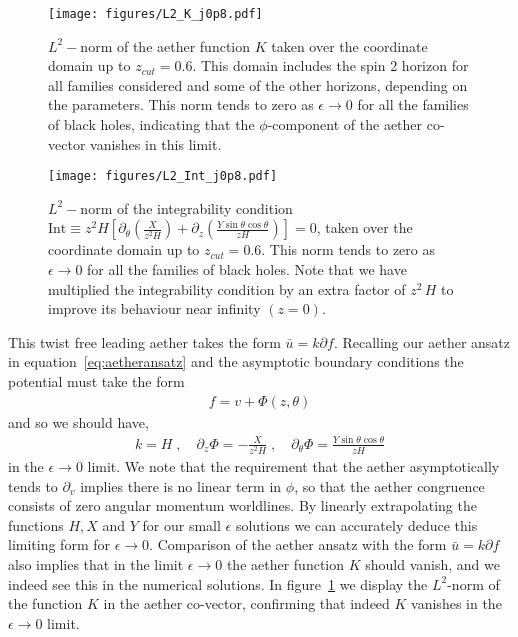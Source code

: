 \documentclass[12pt]{article}
\numberwithin{equation}{section}
\begin{document}
\begin{figure}
\centerline{  
  \texttt{[image: figures/L2\_K\_j0p8.pdf]}
  }
  \caption{\label{fig:KLimit}
  $L^2-$norm of the aether function $K$ taken over the coordinate domain up to $z_{cut}=0.6$. This domain includes the spin 2 horizon for all families considered and some of the other horizons, depending on the parameters. This norm tends to zero as $\epsilon\to 0$ for all the families of black holes, indicating that the $\phi$-component of the aether co-vector vanishes in this limit. 
  }
\end{figure}

\begin{figure}
\centerline{  
  \texttt{[image: figures/L2\_Int\_j0p8.pdf]}
  }
  \caption{\label{fig:IntLimit}
  $L^2-$norm of the integrability condition $\textrm{Int}\equiv z^2H\left[\partial_\theta \left( \frac{X}{z^2 H} \right) + \partial_z\left( \frac{Y \sin\theta \cos\theta}{z H} \right)\right] = 0$,  taken over the coordinate domain up to $z_{cut}=0.6$. This norm tends to zero as $\epsilon\to 0$ for all the families of black holes. Note that we have multiplied the integrability condition by an extra factor of $z^2\,H$ to improve its behaviour near infinity $(z=0)$.
  }
\end{figure}

This twist free leading aether takes the form $\bar{u} = k \partial f$. Recalling our aether ansatz in equation~\eqref{eq:aetheransatz} 
and the asymptotic boundary conditions
the potential must take the form
\begin{eqnarray}
f = v + \Phi(z,\theta)
\end{eqnarray}
and so we should have,
\begin{eqnarray}
k = H \; , \quad \partial_z \Phi = - \frac{X}{z^2 H} \; , \quad \partial_\theta \Phi = \frac{Y \sin\theta \cos\theta}{z H}
\end{eqnarray}
in the $\epsilon \to 0$ limit. 
We note that the requirement that the aether asymptotically tends to $\partial_v$ implies there is no linear term in $\phi$, so that the aether congruence consists of zero angular momentum worldlines. 
By linearly extrapolating the functions $H, X$ and $Y$ for our small $\epsilon$ solutions we can accurately deduce this limiting form for $\epsilon \to 0$.
Comparison of the aether ansatz with the form $\bar{u} = k \partial f$ also implies that in the limit $\epsilon \to 0$ the aether function $K$ should vanish, and we indeed see this in the numerical solutions. In figure~\ref{fig:KLimit} we display the $L^2$-norm of the function $K$ in the aether co-vector, confirming that indeed $K$ vanishes in the $\epsilon\to 0$ limit. 
\end{document}
